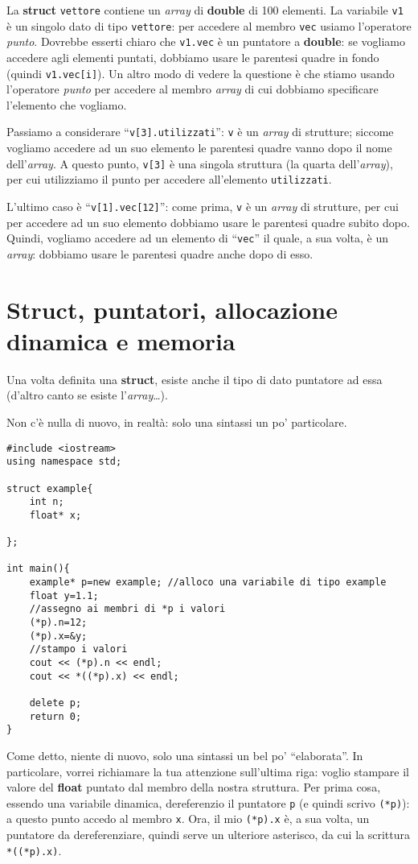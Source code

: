 La \textbf{struct} \verb|vettore| contiene un \emph{array} di \textbf{double} di 100 elementi. La variabile \verb|v1| è un singolo dato di tipo \verb|vettore|: per accedere al membro \verb|vec| usiamo l'operatore \emph{punto}. Dovrebbe esserti chiaro che \verb|v1.vec| è un puntatore a \textbf{double}: se vogliamo accedere agli elementi puntati, dobbiamo usare le parentesi quadre in fondo (quindi \verb|v1.vec[i]|). Un altro modo di vedere la questione è che stiamo usando l'operatore \emph{punto} per accedere al membro \emph{array} di cui dobbiamo specificare l'elemento che vogliamo.

Passiamo a considerare ``\lstinline|v[3].utilizzati|'': \verb|v| è un \emph{array} di strutture; siccome vogliamo accedere ad un suo elemento le parentesi quadre vanno dopo il nome dell'\emph{array}. A questo punto, \verb|v[3]| è una singola struttura (la quarta dell'\emph{array}), per cui utilizziamo il punto per accedere all'elemento \verb|utilizzati|.

L'ultimo caso è ``\lstinline|v[1].vec[12]|'': come prima, \verb|v| è un \emph{array} di strutture, per cui per accedere ad un suo elemento dobbiamo usare le parentesi quadre subito dopo. Quindi, vogliamo accedere ad un elemento di ``\verb|vec|'' il quale, a sua volta, è un \emph{array}: dobbiamo usare le parentesi quadre anche dopo di esso. 


\section{Struct, puntatori, allocazione dinamica e memoria}
Una volta definita una \textbf{struct}, esiste anche il tipo di dato puntatore ad essa (d'altro canto se esiste l'\emph{array}\ldots).  

Non c'è nulla di nuovo, in realtà: solo una sintassi un po' particolare.
\begin{lstlisting}
#include <iostream>
using namespace std;

struct example{
	int n;
	float* x;
	
};

int main(){
	example* p=new example; //alloco una variabile di tipo example
	float y=1.1;
	//assegno ai membri di *p i valori
	(*p).n=12;
	(*p).x=&y;
	//stampo i valori
	cout << (*p).n << endl;
	cout << *((*p).x) << endl;
	
	delete p;
	return 0;
}
\end{lstlisting}\label{struct2}

Come detto, niente di nuovo, solo una sintassi un bel po' ``elaborata''. In particolare, vorrei richiamare la tua attenzione sull'ultima riga: voglio stampare il valore del \textbf{float} puntato dal membro della nostra struttura. Per prima cosa, essendo una variabile dinamica, dereferenzio il puntatore \verb|p| (e quindi scrivo \verb|(*p)|): a questo punto accedo al membro \verb|x|. Ora, il mio \verb|(*p).x| è, a sua volta, un puntatore da dereferenziare, quindi serve un ulteriore asterisco, da cui la scrittura \verb|*((*p).x)|.
